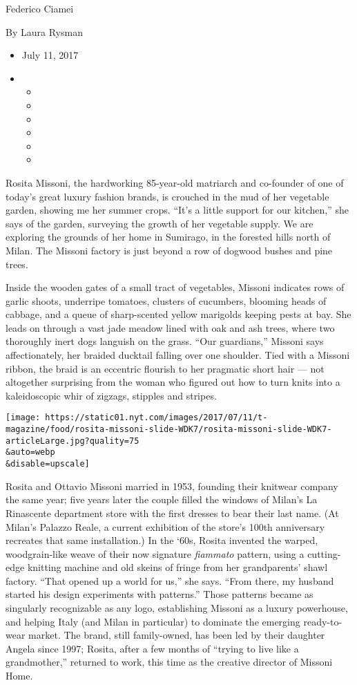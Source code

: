 Federico Ciamei

By Laura Rysman

\begin{itemize}
\item
  July 11, 2017
\item
  \begin{itemize}
  \item
  \item
  \item
  \item
  \item
  \item
  \end{itemize}
\end{itemize}

Rosita Missoni, the hardworking 85-year-old matriarch and co-founder of
one of today's great luxury fashion brands, is crouched in the mud of
her vegetable garden, showing me her summer crops. ``It's a little
support for our kitchen,'' she says of the garden, surveying the growth
of her vegetable supply. We are exploring the grounds of her home in
Sumirago, in the forested hills north of Milan. The Missoni factory is
just beyond a row of dogwood bushes and pine trees.

Inside the wooden gates of a small tract of vegetables, Missoni
indicates rows of garlic shoots, underripe tomatoes, clusters of
cucumbers, blooming heads of cabbage, and a queue of sharp-scented
yellow marigolds keeping pests at bay. She leads on through a vast jade
meadow lined with oak and ash trees, where two thoroughly inert dogs
languish on the grass. ``Our guardians,'' Missoni says affectionately,
her braided ducktail falling over one shoulder. Tied with a Missoni
ribbon, the braid is an eccentric flourish to her pragmatic short hair
--- not altogether surprising from the woman who figured out how to turn
knits into a kaleidoscopic whir of zigzags, stipples and stripes.

\texttt{[image: https://static01.nyt.com/images/2017/07/11/t-magazine/food/rosita-missoni-slide-WDK7/rosita-missoni-slide-WDK7-articleLarge.jpg?quality=75\\\&auto=webp\\\&disable=upscale]}

Rosita and Ottavio Missoni married in 1953, founding their knitwear
company the same year; five years later the couple filled the windows of
Milan's La Rinascente department store with the first dresses to bear
their last name. (At Milan's Palazzo Reale, a current exhibition of the
store's 100th anniversary recreates that same installation.) In the
`60s, Rosita invented the warped, woodgrain-like weave of their now
signature \emph{fiammato} pattern, using a cutting-edge knitting machine
and old skeins of fringe from her grandparents' shawl factory. ``That
opened up a world for us,'' she says. ``From there, my husband started
his design experiments with patterns.'' Those patterns became as
singularly recognizable as any logo, establishing Missoni as a luxury
powerhouse, and helping Italy (and Milan in particular) to dominate the
emerging ready-to-wear market. The brand, still family-owned, has been
led by their daughter Angela since 1997; Rosita, after a few months of
``trying to live like a grandmother,'' returned to work, this time as
the creative director of Missoni Home.

